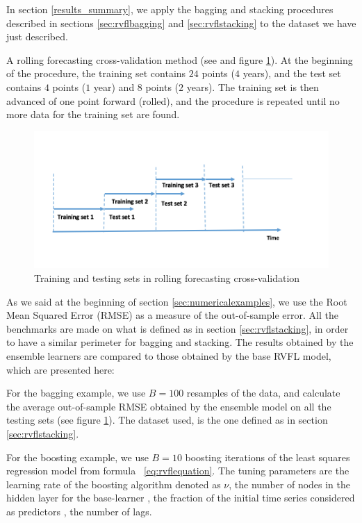 
In section \ref{results_summary}, we apply the bagging and stacking procedures described in sections \ref{sec:rvflbagging} and \ref{sec:rvflstacking} to the dataset we have just described. 


A rolling forecasting cross-validation method (see \cite{bergmeir2015note} and figure \ref{rolling_cv}). At the beginning of the procedure, the training set contains $24$ points ($4$ years), and the test set contains $4$ points ($1$ year) and $8$ points ($2$ years). The training set is then advanced of one point forward (rolled), and the procedure is repeated until no more data for the training set are found.  

\begin{figure}[!htb]
\centering
\includegraphics[width=14cm]{gfx/chapter-rvfl-ensembles/rolling_cv.png}
\caption{Training and testing sets in rolling forecasting cross-validation}
\label{rolling_cv}
\end{figure}

As we said at the beginning of section \ref{sec:numericalexamples}, we use the Root Mean Squared Error (RMSE) as a measure of the out-of-sample error. All the benchmarks are made on what is defined as  in section \ref{sec:rvflstacking}, in order to have a similar perimeter for bagging and stacking. The results obtained by the ensemble learners are compared to those obtained by the base RVFL model, which are presented here: 

For the bagging example, we use $B = 100$ resamples of the data, and calculate the average out-of-sample RMSE obtained by the ensemble model on all the testing sets (see figure \ref{rolling_cv}). The dataset used, is the one defined as  in section \ref{sec:rvflstacking}.  

For the boosting example, we use $B = 10$ boosting iterations of the least squares regression model from formula ~\ref{eq:rvflequation}. The tuning parameters are the learning rate of the boosting algorithm denoted as $\nu$, the number of nodes in the hidden layer for the base-learner , the fraction of the initial time series considered as predictors , the number of lags. 

